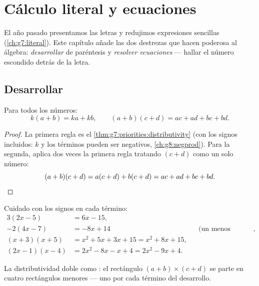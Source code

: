 \chapter{Cálculo literal y ecuaciones}\label{ch:g8:equations}

El año pasado presentamos las letras y redujimos expresiones sencillas
(\cref{ch:g7:literal}). Este capítulo añade las dos destrezas que hacen
poderosa al álgebra: \emph{desarrollar}  de paréntesis y
\emph{resolver ecuaciones} --- hallar el número escondido detrás de la
letra.

\section{Desarrollar}

\begin{theorem}\label{thm:g8:equations:expand}
Para todos los números:
\[
k(a + b) = ka + kb,
\qquad
(a + b)(c + d) = ac + ad + bc + bd .
\]
\end{theorem}

\begin{proof}
La primera regla es el \cref{thm:g7:priorities:distributivity} (con los signos
incluidos: $k$ y los términos pueden ser negativos,
\cref{ch:g8:negprod}). Para la segunda, aplica dos veces la primera regla
tratando $(c + d)$ como un solo número:
\[
(a + b)(c + d) = a(c + d) + b(c + d) = ac + ad + bc + bd .
\qedhere
\]
\end{proof}

\begin{example}\label{ex:g8:equations:expand}
Cuidado con los signos en cada término:
\begin{align*}
3(2x - 5) &= 6x - 15, \\
-2(4x - 7) &= -8x + 14
&& \text{(un menos delante cambia los dos signos)}, \\
(x + 3)(x + 5) &= x^2 + 5x + 3x + 15 = x^2 + 8x + 15, \\
(2x - 1)(x - 4) &= 2x^2 - 8x - x + 4 = 2x^2 - 9x + 4 .
\end{align*}
\end{example}

\begin{omfigure}

{\small La distributividad doble como : el rectángulo
$(a+b) \times (c+d)$ se parte en cuatro rectángulos menores --- uno por
cada término del desarrollo.}
\end{omfigure}

